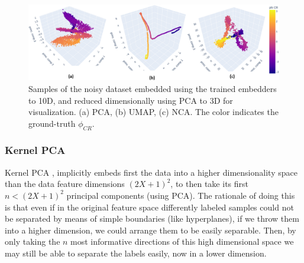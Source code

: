 \documentclass[11pt, a4paper, twoside]{article} %
\begin{document}
\begin{figure}[h!] 
     \centering 
    \includegraphics[width=0.95\linewidth]{emb1.PNG}
    \caption{ Samples of the noisy dataset embedded using the trained embedders to 10D, and reduced dimensionally using PCA to 3D for visualization. (a) PCA, (b) UMAP, (c) NCA. The color indicates the ground-truth $\phi_{CR}$. }
    \label{fig:embeddings1}
\end{figure}

\vspace{-0.55cm}

\subsubsection*{Kernel PCA}\vspace{-0.2cm}
Kernel PCA \cite{KPCA}, implicitly embeds first the data into a higher dimensionality space than the data feature dimensions $(2X+1)^2$, to then take its first $n<(2X+1)^2$ principal components (using PCA). The rationale of doing this is that even if in the original feature space differently labeled samples could not be separated by means of simple boundaries (like hyperplanes), if we throw them into a higher dimension, we could arrange them to be easily separable. Then, by only taking the $n$ most informative directions of this high dimensional space we may still be able to separate the labels easily, now in a lower dimension.
\end{document}
